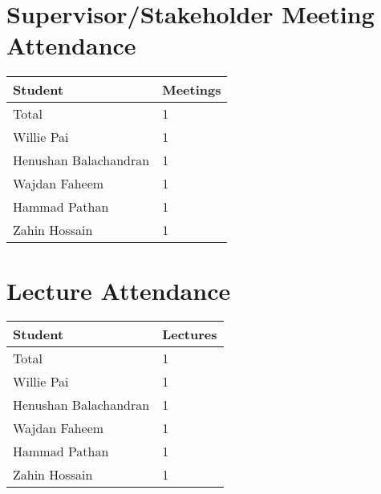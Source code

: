 \documentclass{article}
\begin{document}

\section{Supervisor/Stakeholder Meeting Attendance}


\begin{table}[H]
\centering
\begin{tabular}{ll}
\toprule
\textbf{Student} & \textbf{Meetings}\\
\midrule
Total & 1\\
Willie Pai & 1\\
Henushan Balachandran & 1\\
Wajdan Faheem & 1\\
Hammad Pathan & 1\\
Zahin Hossain & 1\\
\bottomrule
\end{tabular}
\end{table}


\section{Lecture Attendance}


\begin{table}[H]
\centering
\begin{tabular}{ll}
\toprule
\textbf{Student} & \textbf{Lectures}\\
\midrule
Total & 1\\
Willie Pai & 1\\
Henushan Balachandran & 1\\
Wajdan Faheem & 1\\
Hammad Pathan & 1\\
Zahin Hossain & 1\\
\bottomrule
\end{tabular}
\end{table}
\end{document}
